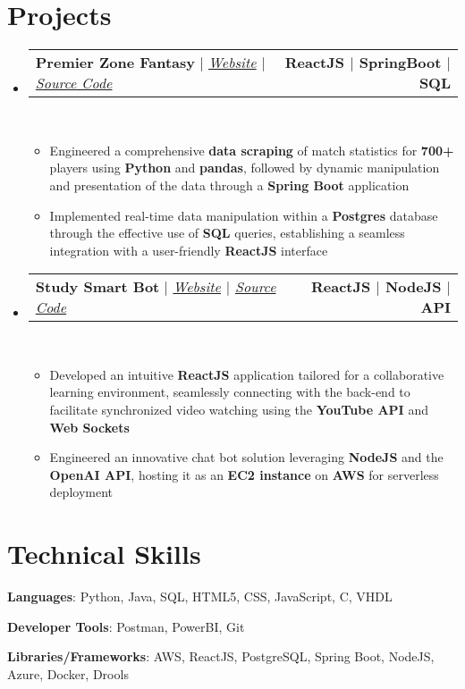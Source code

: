 \documentclass[letterpaper,11pt]{article}
\makeatletter
\newcommand{\resumeItem}[1]{
  \item\small{
    {#1 \vspace{0pt}}
  }
}
\newcommand{\resumeProjectHeading}[2]{
    \item
    \begin{tabular*}{1.001\textwidth}{l@{\extracolsep{\fill}}r}
      \small#1 & \textbf{\small #2}\\
    \end{tabular*}\vspace{-7pt}
}
\newcommand{\resumeSubHeadingListStart}{\begin{itemize}[leftmargin=0.0in, label={}]}
\newcommand{\resumeSubHeadingListEnd}{\end{itemize}\vspace{0pt}}
\newcommand{\resumeItemListStart}{\begin{itemize}}
\newcommand{\resumeItemListEnd}{\end{itemize}\vspace{-5pt}}
\makeatother
\begin{document}
\vspace{-5pt}

\section{Projects} 
\vspace{-5pt}
\resumeSubHeadingListStart
\resumeProjectHeading
{\textbf{{Premier Zone Fantasy}} $|$ \emph{\href{https://premierzone.netlify.app/}{Website}{ $|$ }\href{https://github.com/michael-scott/PLWebsite}{Source Code}}}{ReactJS $|$ SpringBoot $|$ SQL}
\\[5mm]
\resumeItemListStart
\resumeItem{Engineered a comprehensive \textbf{data scraping} of match statistics for \textbf{700+} players using \textbf{Python} and \textbf{pandas}, followed by dynamic manipulation and presentation of the data through a \textbf{Spring Boot} application}
\resumeItem{Implemented real-time data manipulation within a \textbf{Postgres} database through the effective use of \textbf{SQL} queries, establishing a seamless integration with a user-friendly \textbf{ReactJS} interface}
\resumeItemListEnd 
\vspace{-17pt}
\resumeProjectHeading
{\textbf{{Study Smart Bot}} $|$ \emph{\href{https://studysmartbot.netlify.app/}{Website}{ $|$ }\href{https://github.com/michael-scott/StudySmartBot}{Source Code}}}{ReactJS $|$ NodeJS $|$ API}
\\[5mm]
\resumeItemListStart
\resumeItem{Developed an intuitive \textbf{ReactJS} application tailored for a collaborative learning environment, seamlessly connecting with the back-end to facilitate synchronized video watching using the \textbf{YouTube API} and \textbf{Web Sockets}}
\resumeItem{Engineered an innovative chat bot solution leveraging \textbf{NodeJS} and the \textbf{OpenAI API}, hosting it as an \textbf{EC2 instance} on \textbf{AWS} for serverless deployment}
\resumeItemListEnd 
\resumeSubHeadingListEnd
\vspace{-10pt}


\section{Technical Skills}
\begin{itemize}[leftmargin=0.15in, label={}]
\small{
\item{\textbf{Languages}{: Python, Java, SQL, HTML5, CSS, JavaScript, C, VHDL} \\[1mm]}
\item{\textbf{Developer Tools}{: Postman, PowerBI, Git} \\[1mm]}
\item{\textbf{Libraries/Frameworks}{: AWS, ReactJS, PostgreSQL, Spring Boot, NodeJS, Azure, Docker, Drools} \\ [1mm]}
}
\end{itemize}
\vspace{-16pt}
\vspace{3pt}
\vspace{10pt}

\vspace{-15pt}
\end{document}
